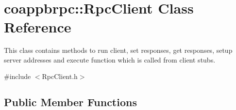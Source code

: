 \hypertarget{classcoappbrpc_1_1RpcClient}{}\section{coappbrpc\+:\+:Rpc\+Client Class Reference}
\label{classcoappbrpc_1_1RpcClient}


This class contains methods to run client, set responses, get responses, setup server addresses and execute function which is called from client stubs.  




{\ttfamily \#include $<$Rpc\+Client.\+h$>$}

\subsection*{Public Member Functions}
